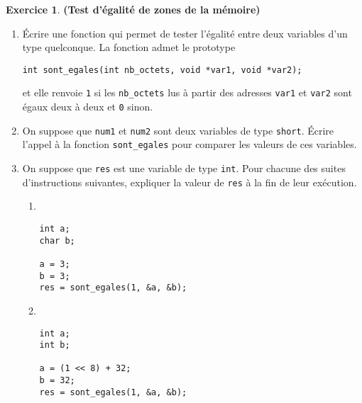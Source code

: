 \documentclass[12pt]{article}
\theoremstyle{definition}
\newtheorem{Exercice}{Exercice}
\begin{document}
\begin{Exercice} {\bf (Test d'égalité de zones de la mémoire)}\smallskip
\begin{enumerate}
    \item Écrire une fonction qui permet de tester l'égalité entre deux
    variables d'un type quelconque. La fonction admet le prototype
\begin{lstlisting}
int sont_egales(int nb_octets, void *var1, void *var2);
\end{lstlisting}
    et elle renvoie {\tt 1} si les {\tt nb\_octets} lus à partir des adresses
    {\tt var1} et {\tt var2} sont égaux deux à deux et {\tt 0} sinon.
    \smallskip

    \item On suppose que {\tt num1} et {\tt num2} sont deux variables
    de type {\tt short}. Écrire l'appel à la fonction {\tt sont\_egales}
    pour comparer les valeurs de ces variables.
    \smallskip

    \item On suppose que {\tt res} est une variable de type {\tt int}.
    Pour chacune des suites d'instructions suivantes, expliquer la
    valeur de {\tt res} à la fin de leur exécution.
    \begin{multicols}{2}
        \begin{enumerate}[label = ({\alph*})]
            \item ~
\begin{lstlisting}
int a;
char b;

a = 3;
b = 3;
res = sont_egales(1, &a, &b);
\end{lstlisting}

            \item ~
\begin{lstlisting}
int a;
int b;

a = (1 << 8) + 32;
b = 32;
res = sont_egales(1, &a, &b);
\end{lstlisting}
        \end{enumerate}
    \end{multicols}
\end{enumerate}
\end{Exercice}
\bigskip
\end{document}
